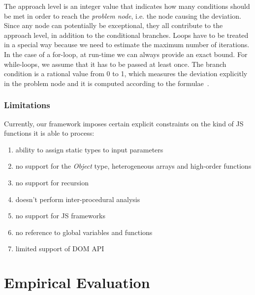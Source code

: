 \documentclass[sigconf,review]{acmart}
\begin{document}
The approach level is an integer value that indicates how many conditions should be met in order to reach the \emph{problem node}, i.e. the node causing the deviation. Since any node can potentially be exceptional, they all contribute to the approach level, in addition to the conditional branches. Loops have to be treated in a special way because we need to estimate the maximum number of iterations. In the case of a for-loop, at run-time we can always provide an exact bound. For while-loops, we assume that it has to be passed at least once. The branch condition is a rational value from 0 to 1, which measures the deviation explicitly in the problem node and it is computed according to the formulae~\cite{tracey1998automated}.
 
\subsubsection{Limitations}
\label{sub.sub.sec.limit}

Currently, our framework imposes certain explicit constraints on the kind of JS functions it is able to process: 
\begin{enumerate}
\item ability to assign static types to input parameters 
\item no support for the \emph{Object} type, heterogeneous arrays and high-order functions
\item no support for recursion
\item doesn't perform inter-procedural analysis
\item no support for JS frameworks
\item no reference to global variables and functions
\item limited support of DOM API     
\end{enumerate}

\section{Empirical Evaluation}
\label{sec.evaluation}
\end{document}

